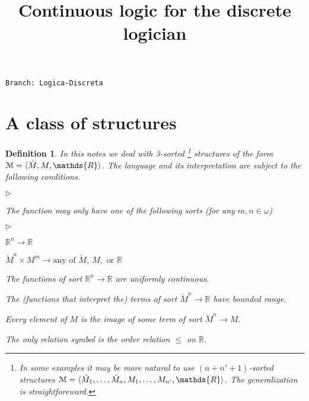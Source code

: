 \documentclass[12pt,letterpaper,oneside,reqno]{amsart}
\newcommand{\mylabel}[1]{{#1}\hfill}
\renewenvironment{itemize}
  {\begin{list}{$\triangleright$}{%
   \setlength{\parskip}{0mm}
   \setlength{\topsep}{.2\baselineskip}
   \setlength{\rightmargin}{0mm}
   \setlength{\listparindent}{0mm}
   \setlength{\itemindent}{0mm}
   \setlength{\labelwidth}{3ex}
   \setlength{\itemsep}{.2\baselineskip}
   \setlength{\parsep}{.2\baselineskip}
   \setlength{\partopsep}{0mm}
   \setlength{\labelsep}{1ex}
   \setlength{\leftmargin}{\labelwidth+\labelsep}
   \let\makelabel\mylabel}}{%
   \end{list}}
\theoremstyle{plain}
\newtheorem{definition}[theorem]{Definition}
\theoremstyle{remark}
\begin{document}
\title{Continuous logic for the discrete logician}
\hfill\texttt{Branch: Logica-Discreta \ \DTMnow}\bigskip
\maketitle
\raggedbottom
\section{A class of structures}\label{uno}

\def\ceq#1#2#3{\parbox[t]{43ex}{$\displaystyle #1$}\parbox{5ex}{\hfil $#2$}{$\displaystyle #3$}}

\begin{definition}\label{def_1}
  In this notes we deal with 3-sorted%
  \footnote{In some examples it may be more natural to use $(n+n'+1)$-sorted structures ${\EuScript M}=\langle \breve M_1,\dots,\breve M_n,M_1,\dots,M_{n'},\mathds{R}\rangle$. The generalization is straightforeward.} 
  structures of the form ${\EuScript M}=\langle \breve M,M,\mathds{R}\rangle$.
  The language and its interpretation are subject to the following conditions.
  \begin{itemize}
  \item[1.] The function may only have one of the following sorts (for any $m,n\in\omega$)
  \begin{itemize}
    \item[a.] $\mathds{R}^n\to\mathds{R}$
    \item[b.] $\breve M^n\times{M}^m\to\textrm{any of } \breve M,\ M,\textrm{ or }\mathds{R}$
  \end{itemize}
  \item[2.] The functions of sort $\mathds{R}^n\to\mathds{R}$ are \textit{uniformly continuous}.
  \item[3.] The (functions that interpret the) terms of sort $\breve M^n\to\mathds{R}$ have \textit{bounded\/} range.
  \item[4.] Every element of $M$ is the image of some term of sort $\breve M^n\to M$.  
  \item[5.] The only relation symbol is the order relation $\le$ on $\mathds{R}$.
  \end{itemize}
\end{definition}
\end{document}
